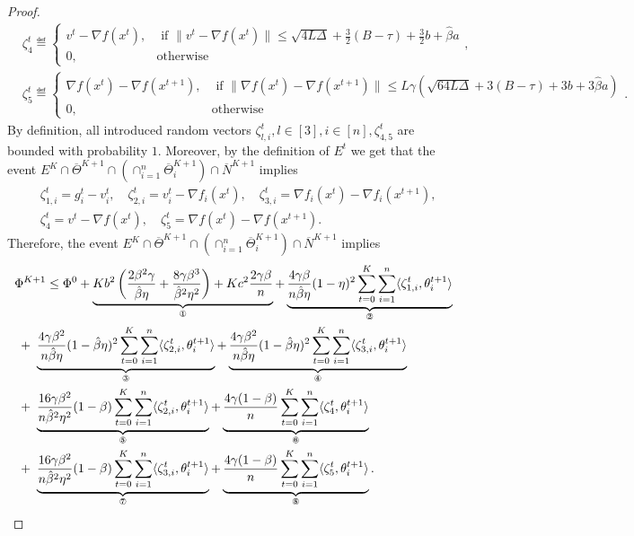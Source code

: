 \documentclass[a4paper,11pt]{article}
\begin{document}
\begin{proof}
\begin{align*}
    &\zeta_{4}^t \eqdef \begin{cases} 
    v^t - \nabla f(x^{t}), &\text{ if } \|v^t - \nabla f(x^{t})\| \le \sqrt{4L\Delta} + \frac{3}{2}(B-\tau) + \frac{3}{2}b + \hat{\beta}a\\
	0, &\text{otherwise}
    \end{cases}, \\
    &\zeta_{5}^t \eqdef \begin{cases} 
    \nabla f(x^t) - \nabla f(x^{t+1}), &\text{ if } \|\nabla f(x^t) - \nabla f(x^{t+1})\| \le L\gamma\left(\sqrt{64L\Delta} + 3(B-\tau) + 3 b + 3\hat{\beta}a\right)\\
	0, &\text{otherwise}
    \end{cases}.
    \end{align*}
    By definition, all introduced random vectors $\zeta_{l,i}^t, l\in[3], i\in[n], \zeta_{4,5}^t$ are bounded with probability $1$. Moreover, by the definition of  $E^t$ we get that the event $E^K\cap \overline{\Theta}^{K+1}\cap \left(\cap_{i=1}^n\overline{\Theta}^{K+1}_i\right) \cap \overline{N}^{K+1}$ implies 
    \begin{align*}
    &\zeta_{1,i}^t = g_i^t-v_i^t,\quad  \zeta_{2,i}^t = v_i^t-\nabla f_i(x^t), \quad \zeta_{3,i}^t = \nabla f_i(x^t) - \nabla f_i(x^{t+1}),\\
    &\zeta_{4}^t = v^t-\nabla f(x^t),\quad \zeta_{5}^t = \nabla f(x^t) - \nabla f(x^{t+1}).
    \end{align*}
    Therefore, the event $E^K\cap \overline{\Theta}^{K+1} \cap \left(\cap_{i=1}^n\overline{\Theta}^{K+1}_i\right) \cap \overline{N}^{K+1}$ implies 
    \begin{align*}
    &\Phi^{K+1}
    \le \Phi^0 
    + \underbrace{K b^2\left(\frac{2\beta^2\gamma}{\hat{\beta}\eta} + \frac{8\gamma\beta^3}{\hat{\beta}^2\eta^2}\right) + Kc^2\frac{2\gamma\beta}{n}}_{\circledOne}
    + \underbrace{\frac{4\gamma\beta}{n\hat{\beta}\eta}(1-\eta)^2\sum_{t=0}^{K}\sum_{i=1}^n\<\zeta_{1,i}^t, \theta^{t+1}_i>}_{\circledTwo}\\
    &\;+\; \underbrace{\frac{4\gamma\beta^2}{n\hat{\beta}\eta}(1-\hat{\beta}\eta)^2\sum_{t=0}^{K}\sum_{i=1}^n\<\zeta_{2,i}^t, \theta^{t+1}_i>}_{\circledThree}
    +  \underbrace{\frac{4\gamma\beta^2}{n\hat{\beta}\eta}(1-\hat{\beta}\eta)^2\sum_{t=0}^{K}\sum_{i=1}^n\<\zeta_{3,i}^t, \theta^{t+1}_i>}_{\circledFour}\\
    &\;+\; \underbrace{\frac{16\gamma\beta^2}{n\hat{\beta}^2\eta^2}(1-\beta)\sum_{t=0}^{K}\sum_{i=1}^n\<\zeta_{2,i}^t, \theta^{t+1}_i>}_{\circledFive}
    + \underbrace{\frac{4\gamma(1-\beta)}{n}\sum_{t=0}^{K}\sum_{i=1}^n\<\zeta_{4}^t, \theta^{t+1}_i>}_{\circledSix}\\
    &\;+\; \underbrace{\frac{16\gamma\beta^2}{n\hat{\beta}^2\eta^2}(1-\beta)\sum_{t=0}^{K}\sum_{i=1}^n\<\zeta_{3,i}^t, \theta^{t+1}_i>}_{\circledSeven}
    + \underbrace{\frac{4\gamma(1-\beta)}{n}\sum_{t=0}^{K}\sum_{i=1}^n\<\zeta_{5}^t, \theta^{t+1}_i>}_{\circledEight}.
    \end{align*}
    

\end{proof}
\end{document}

